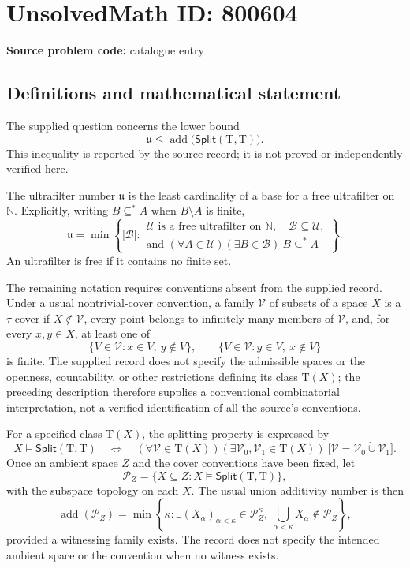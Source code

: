 \documentclass[11pt]{article}
\newcommand{\N}{\mathbb{N}}
\begin{document}
\section*{UnsolvedMath ID: 800604}
\textbf{Source problem code:} catalogue entry
\subsection{Definitions and mathematical statement}
The supplied question concerns the lower bound
\[
\mathfrak{u}\leq \operatorname{add}\bigl(\mathsf{Split}(\mathrm{T},\mathrm{T})\bigr).
\]
This inequality is reported by the source record; it is not proved or independently verified here.

The ultrafilter number \(\mathfrak{u}\) is the least cardinality of a base for a free ultrafilter on \(\N\). Explicitly, writing \(B\subseteq^* A\) when \(B\setminus A\) is finite,
\[
\mathfrak{u}=\min\left\{|\mathcal{B}|:\begin{array}{l}
\mathcal{U}\text{ is a free ultrafilter on }\N,\quad \mathcal{B}\subseteq\mathcal{U},\\
\text{and }(\forall A\in\mathcal{U})(\exists B\in\mathcal{B})\ B\subseteq^* A
\end{array}\right\}.
\]
An ultrafilter is free if it contains no finite set.

The remaining notation requires conventions absent from the supplied record. Under a usual nontrivial-cover convention, a family \(\mathcal{V}\) of subsets of a space \(X\) is a \(\tau\)-cover if \(X\notin\mathcal{V}\), every point belongs to infinitely many members of \(\mathcal{V}\), and, for every \(x,y\in X\), at least one of
\[
\{V\in\mathcal{V}:x\in V,\ y\notin V\},
\qquad
\{V\in\mathcal{V}:y\in V,\ x\notin V\}
\]
is finite. The supplied record does not specify the admissible spaces or the openness, countability, or other restrictions defining its class \(\mathrm{T}(X)\); the preceding description therefore supplies a conventional combinatorial interpretation, not a verified identification of all the source's conventions.

For a specified class \(\mathrm{T}(X)\), the splitting property is expressed by
\[
X\models\mathsf{Split}(\mathrm{T},\mathrm{T})
\quad\Longleftrightarrow\quad
(\forall\mathcal{V}\in\mathrm{T}(X))
(\exists\mathcal{V}_0,\mathcal{V}_1\in\mathrm{T}(X))\
\bigl[\mathcal{V}=\mathcal{V}_0\mathbin{\dot\cup}\mathcal{V}_1\bigr].
\]
Once an ambient space \(Z\) and the cover conventions have been fixed, let
\[
\mathcal{P}_Z=\{X\subseteq Z:X\models\mathsf{Split}(\mathrm{T},\mathrm{T})\},
\]
with the subspace topology on each \(X\). The usual union additivity number is then
\[
\operatorname{add}(\mathcal{P}_Z)=
\min\left\{\kappa:\exists(X_\alpha)_{\alpha<\kappa}\in\mathcal{P}_Z^\kappa,
\ \bigcup_{\alpha<\kappa}X_\alpha\notin\mathcal{P}_Z\right\},
\]
provided a witnessing family exists. The record does not specify the intended ambient space or the convention when no witness exists.
\end{document}
